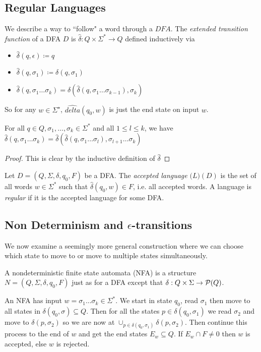 \documentclass[10pt,a4paper]{article}
\begin{document}
\subsection*{Regular Languages}
We describe a way to ``follow" a word through a $DFA$. The \emph{extended transition function} of a DFA $D$ is $\hat{\delta} : Q \times \Sigma^\ast \to Q$ defined inductively via 
\begin{itemize}
\item $\hat{\delta}(q, \epsilon) \coloneqq q$
\item $\hat{\delta}(q, \sigma_1) \coloneqq \delta(q, \sigma_1)$
\item $\hat{\delta}(q, \sigma_1\ldots\sigma_k) = \delta(\hat{\delta}(q, \sigma_1\ldots\sigma_{k-1}), \sigma_k)$
\end{itemize}
So for any $w \in \Sigma^\star$, $\hat{delta}(q_0, w)$ is just the end state on input $w$.

\begin{lemma}
For all $q \in Q, \sigma_1, \ldots, \sigma_k \in \Sigma^\ast$ and all $1 \leq l \leq k$, we have $\hat{\delta}(q, \sigma_1\ldots\sigma_k) = \hat{\delta}(\hat{\delta}(q, \sigma_1\ldots\sigma_l), \sigma_{l+1}\ldots\sigma_k)$
\end{lemma}
\begin{proof}
This is clear by the inductive definition of $\hat{\delta}$
\end{proof}

Let $D = (Q, \Sigma, \delta, q_0, F)$ be a DFA. The \emph{accepted language} $\mathcal(L)(D)$ is the set of all words $w \in \Sigma^\ast$ such that $\hat{\delta}(q_0, w) \in F$, i.e. all accepted words. A language is \emph{regular} if it is the accepted language for some DFA.

\subsection*{Non Determinism and $\epsilon$-transitions}
We now examine a seemingly more general construction where we can choose which state to move to or move to multiple states simultaneously.

A nondeterministic finite state automata (NFA) is a structure $N=(Q, \Sigma, \delta, q_0, F)$ just as for a DFA except that $\delta:Q \times \Sigma \to \mathcal{P}(Q)$.

An NFA has input $w = \sigma_1\ldots\sigma_k \in \Sigma^\ast$. We start in state $q_0$, read $\sigma_1$ then move to all states in $\delta(q_0, \sigma) \subseteq Q$. Then for all the states $p \in \delta(q_0, \sigma_1)$ we read $\sigma_2$ and move to $\delta(p, \sigma_2)$ so we are now at $\cup_{p\in\delta(q_0, \sigma_1)} \delta(p, \sigma_2)$. Then continue this process to the end of $w$ and get the end states $E_w \subseteq Q$. If $E_w \cap F \neq 0$ then $w$ is accepted, else $w$ is rejected.
\end{document}
